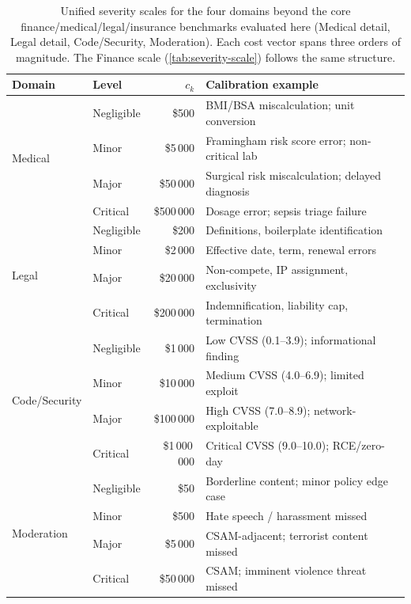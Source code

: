 \begin{table}[t]
\centering
\begin{tabular}{@{}llrl@{}}
\toprule
Domain & Level & $c_k$ & Calibration example \\
\midrule
\multirow{4}{*}{Medical}
  & Negligible & \$500    & BMI/BSA miscalculation; unit conversion \\
  & Minor      & \$5\,000  & Framingham risk score error; non-critical lab \\
  & Major      & \$50\,000 & Surgical risk miscalculation; delayed diagnosis \\
  & Critical   & \$500\,000 & Dosage error; sepsis triage failure \\
\midrule
\multirow{4}{*}{Legal}
  & Negligible & \$200    & Definitions, boilerplate identification \\
  & Minor      & \$2\,000  & Effective date, term, renewal errors \\
  & Major      & \$20\,000 & Non-compete, IP assignment, exclusivity \\
  & Critical   & \$200\,000 & Indemnification, liability cap, termination \\
\midrule
\multirow{4}{*}{Code/Security}
  & Negligible & \$1\,000     & Low CVSS (0.1--3.9); informational finding \\
  & Minor      & \$10\,000    & Medium CVSS (4.0--6.9); limited exploit \\
  & Major      & \$100\,000   & High CVSS (7.0--8.9); network-exploitable \\
  & Critical   & \$1\,000\,000 & Critical CVSS (9.0--10.0); RCE/zero-day \\
\midrule
\multirow{4}{*}{Moderation}
  & Negligible & \$50     & Borderline content; minor policy edge case \\
  & Minor      & \$500    & Hate speech / harassment missed \\
  & Major      & \$5\,000  & CSAM-adjacent; terrorist content missed \\
  & Critical   & \$50\,000 & CSAM; imminent violence threat missed \\
\bottomrule
\end{tabular}
\caption{Unified severity scales for the four domains beyond the
core finance/medical/legal/insurance benchmarks evaluated here
(Medical detail, Legal detail, Code/Security, Moderation). Each cost
vector spans three orders of magnitude. The Finance scale
(\autoref{tab:severity-scale}) follows the same structure.}
\label{tab:domain-scales}
\end{table}

